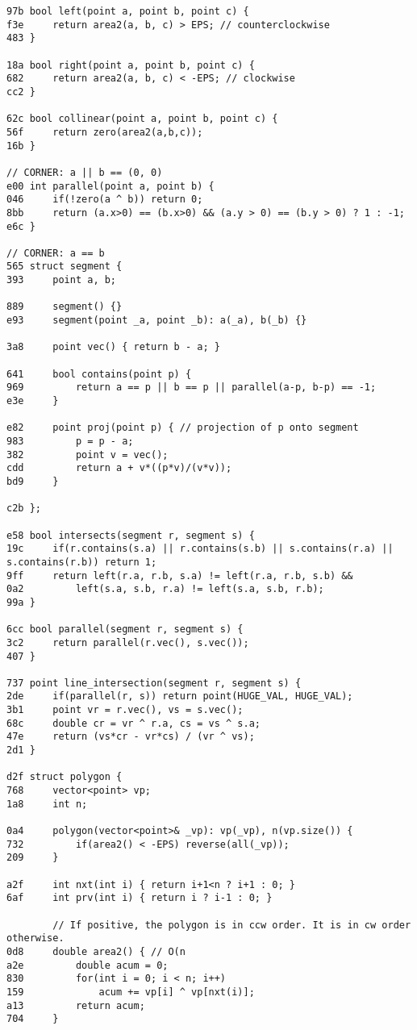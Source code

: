 \documentclass[11pt, a4paper, twoside]{article}
\begin{document}
\begin{lstlisting}
97b bool left(point a, point b, point c) {
f3e 	return area2(a, b, c) > EPS; // counterclockwise
483 }

18a bool right(point a, point b, point c) {
682 	return area2(a, b, c) < -EPS; // clockwise
cc2 }

62c bool collinear(point a, point b, point c) {
56f 	return zero(area2(a,b,c));
16b }

// CORNER: a || b == (0, 0)
e00 int parallel(point a, point b) {
046 	if(!zero(a ^ b)) return 0;
8bb 	return (a.x>0) == (b.x>0) && (a.y > 0) == (b.y > 0) ? 1 : -1;
e6c }

// CORNER: a == b
565 struct segment {
393 	point a, b;
    
889 	segment() {}
e93 	segment(point _a, point _b): a(_a), b(_b) {}
    
3a8 	point vec() { return b - a; }
    
641 	bool contains(point p) {
969 		return a == p || b == p || parallel(a-p, b-p) == -1;
e3e 	}
    
e82 	point proj(point p) { // projection of p onto segment
983 		p = p - a;
382 		point v = vec();
cdd 		return a + v*((p*v)/(v*v));
bd9 	}
    
c2b };

e58 bool intersects(segment r, segment s) {
19c 	if(r.contains(s.a) || r.contains(s.b) || s.contains(r.a) || s.contains(r.b)) return 1;
9ff 	return left(r.a, r.b, s.a) != left(r.a, r.b, s.b) && 
0a2 		left(s.a, s.b, r.a) != left(s.a, s.b, r.b);
99a }

6cc bool parallel(segment r, segment s) {
3c2 	return parallel(r.vec(), s.vec());
407 }

737 point line_intersection(segment r, segment s) {
2de 	if(parallel(r, s)) return point(HUGE_VAL, HUGE_VAL);
3b1 	point vr = r.vec(), vs = s.vec();
68c 	double cr = vr ^ r.a, cs = vs ^ s.a;
47e 	return (vs*cr - vr*cs) / (vr ^ vs);
2d1 }

d2f struct polygon {
768 	vector<point> vp;
1a8 	int n;
    
0a4 	polygon(vector<point>& _vp): vp(_vp), n(vp.size()) {
732 		if(area2() < -EPS) reverse(all(_vp));
209 	}
    
a2f 	int nxt(int i) { return i+1<n ? i+1 : 0; }
6af 	int prv(int i) { return i ? i-1 : 0; }
    
    	// If positive, the polygon is in ccw order. It is in cw order otherwise.
0d8 	double area2() { // O(n
a2e 		double acum = 0;
830 		for(int i = 0; i < n; i++)
159 			acum += vp[i] ^ vp[nxt(i)];
a13 		return acum;
704 	}
    

\end{lstlisting}
\end{document}
